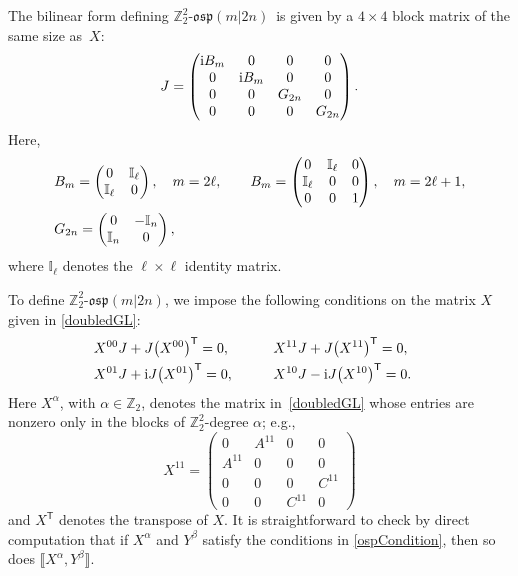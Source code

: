\documentclass[pdftex]{sigma}
\numberwithin{equation}{section}
\theoremstyle{definition}
\def\Z2{\mathbb{Z}_2^2}
\def\osp{\mathfrak{osp}}
\def\Zosp{$\Z2$-$\osp(m|2n)$}
\begin{document}
The bilinear form defining \Zosp\ is given by a $ 4 \times 4$ block matrix of the same size as~$X$:
\begin{equation*}
	J =
	\begin{pmatrix}
		{\rm i}B_m & 0 & 0 & 0
		\\
		0 & {\rm i}B_m & 0 & 0
		\\
		0 & 0 & G_{2n} & 0
		\\
		0 & 0 & 0 & G_{2n}
	\end{pmatrix}.
\end{equation*}
Here,
\begin{align*}
	&B_m=
	\begin{pmatrix}
		0 & \mathbb{I}_{\ell} \\ \mathbb{I}_{\ell} & 0
	\end{pmatrix}, \quad m = 2\ell,
	\qquad
	B_m =
	\begin{pmatrix}
		0 & \mathbb{I}_{\ell} & 0 \\ \mathbb{I}_{\ell} & 0 & 0
		\\
		0 & 0 & 1
	\end{pmatrix}, \quad m = 2\ell+1,
	\notag \\
	&G_{2n}=
	\begin{pmatrix}
		0 & -\mathbb{I}_{n} \\ \mathbb{I}_{n} & 0
	\end{pmatrix},
\end{align*}
where $ \mathbb{I}_{\ell} $ denotes the $\ell \times \ell$ identity matrix.

To define \Zosp, we impose the following conditions on the matrix $X$ given in \eqref{doubledGL}:
\begin{alignat}{3}
&	X^{00}J + J \bigl(X^{00}\bigr)^{\mathsf{T}}= 0,\qquad &&
	X^{11}J + J \bigl(X^{11}\bigr)^{\mathsf{T}}= 0,&
	\notag\\
&	X^{01}J + {\rm i}J \bigl(X^{01}\bigr)^{\mathsf{T}}= 0,
	\qquad &&
	X^{10}J -{\rm i} J \bigl(X^{10}\bigr)^{\mathsf{T}}= 0.& \label{ospCondition}
\end{alignat}
Here $X^{\alpha}$, with $\alpha \in \mathbb{Z}_2$, denotes the matrix in~\eqref{doubledGL} whose entries are nonzero only in the blocks of $\mathbb{Z}_2^2$-degree $\alpha$; e.g.,
\begin{equation*}
	X^{11} =
	\begin{pmatrix}
		0 & A^{11} & 0 & 0
		\\
		A^{11} & 0 & 0 & 0
		\\
		0 & 0 & 0 & C^{11}
		\\
		0 & 0 & C^{11} & 0
	\end{pmatrix}
\end{equation*}
and $ X^{\mathsf{T}} $ denotes the transpose of $X.$
It is straightforward to check by direct computation that if $X^{\alpha}$ and $Y^{\beta}$ satisfy the conditions in \eqref{ospCondition}, then so does $\llbracket X^{\alpha}, Y^{\beta} \rrbracket$.
\end{document}
